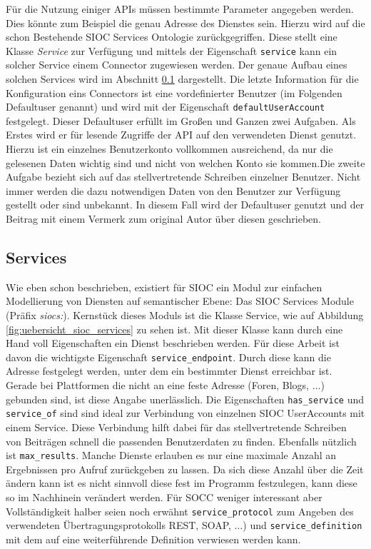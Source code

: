 Für die Nutzung einiger APIs müssen bestimmte Parameter angegeben werden. Dies könnte zum Beispiel die genau Adresse des Dienstes sein. Hierzu wird auf die schon Bestehende SIOC Services Ontologie zurückgegriffen. Diese stellt eine Klasse \emph{Service} zur Verfügung und mittels der Eigenschaft \texttt{service} kann ein solcher Service einem Connector zugewiesen werden. Der genaue Aufbau eines solchen Services wird im Abschnitt \ref{sub:services} dargestellt. Die letzte Information für die Konfiguration eins Connectors ist eine vordefinierter Benutzer (im Folgenden Defaultuser genannt) und wird mit der Eigenschaft \texttt{defaultUserAccount} festgelegt. Dieser Defaultuser erfüllt im Großen und Ganzen zwei Aufgaben. Als Erstes wird er für lesende Zugriffe der API auf den verwendeten Dienst genutzt. Hierzu ist ein einzelnes Benutzerkonto vollkommen ausreichend, da nur die gelesenen Daten wichtig sind und nicht von welchen Konto sie kommen.Die zweite Aufgabe bezieht sich auf das stellvertretende Schreiben einzelner Benutzer. Nicht immer werden die dazu notwendigen Daten von den Benutzer zur Verfügung gestellt oder sind unbekannt. In diesem Fall wird der Defaultuser genutzt und der Beitrag mit einem Vermerk zum original Autor über diesen geschrieben.


\subsection{Services} %
\label{sub:services}

Wie eben schon beschrieben, existiert für SIOC ein Modul zur einfachen Modellierung von Diensten auf semantischer Ebene: Das SIOC Services Module (Präfix \emph{siocs:}). Kernstück dieses Moduls ist die Klasse Service, wie auf Abbildung \ref{fig:uebersicht_sioc_services} zu sehen ist. Mit dieser Klasse kann durch eine Hand voll Eigenschaften ein Dienst beschrieben werden. Für diese Arbeit ist davon die wichtigste Eigenschaft \texttt{service\_endpoint}. Durch diese kann die Adresse festgelegt werden, unter dem ein bestimmter Dienst erreichbar ist. Gerade bei Plattformen die nicht an eine feste Adresse (Foren, Blogs, $\dots$) gebunden sind, ist diese Angabe unerlässlich. Die Eigenschaften \texttt{has\_service} und \texttt{service\_of} sind sind ideal zur Verbindung von einzelnen SIOC UserAccounts mit einem Service. Diese Verbindung hilft dabei für das stellvertretende Schreiben von Beiträgen schnell die passenden Benutzerdaten zu finden. Ebenfalls nützlich ist \texttt{max\_results}. Manche Dienste erlauben es nur eine maximale Anzahl an Ergebnissen pro Aufruf zurückgeben zu lassen. Da sich diese Anzahl über die Zeit ändern kann ist es nicht sinnvoll diese fest im Programm festzulegen, kann diese so im Nachhinein verändert werden. Für SOCC weniger interessant aber Vollständigkeit halber seien noch erwähnt \texttt{service\_protocol} zum Angeben des verwendeten Übertragungsprotokolls REST, SOAP, $\dots$) und \texttt{service\_definition} mit dem auf eine weiterführende Definition verwiesen werden kann. 

